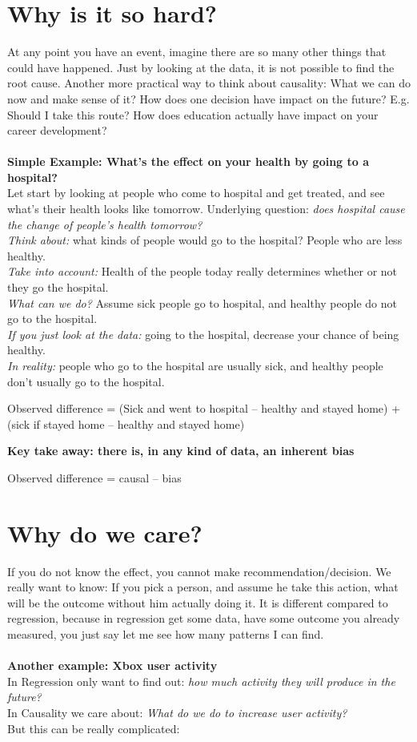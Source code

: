 \section{Why is it so hard?}
At any point you have an event, imagine there are so many other things that could have happened. Just by looking at the data, it is not possible to find the root cause. Another more practical way to think about causality: What we can do now and make sense of it? How does one decision have impact on the future? E.g. Should I take this route? How does education actually have impact on your career development?\\
\\
\textbf{Simple Example: What's the effect on your health by going to a hospital?}\\
Let start by looking at people who come to hospital and get treated, and see what’s their health looks like tomorrow. Underlying question: \textit{does hospital cause the change of people’s health tomorrow?}\\
\textit{Think about:} what kinds of people would go to the hospital? People who are less healthy.\\
\textit{Take into account:} Health of the people today really determines whether or not they go the hospital.\\
\textit{What can we do?} Assume sick people go to hospital, and healthy people do not go to the hospital.\\
\textit{If you just look at the data:} going to the hospital, decrease your chance of being healthy.\\
\textit{In reality:} people who go to the hospital are usually sick, and healthy people don't usually go to the hospital.\\
\begin{center} Observed difference =  (Sick and went to hospital -- healthy and stayed home) + (sick if stayed home -- healthy and stayed home)
\end{center}
\noindent\textbf{Key take away: there is, in any kind of data, an inherent bias}
\begin{center} Observed difference =  causal -- bias
\end{center}

\section{Why do we care?}
If you do not know the effect, you cannot make recommendation/decision. We really want to know: If you pick a person, and assume he take this action, what will be the outcome without him actually doing it.
 It is different compared to regression, because in regression get some data, have some outcome you already measured, you just say let me see how many patterns I can find.\\
\\
\textbf{Another example: Xbox user activity}\\
In Regression only want to find out: \textit{how much activity they will produce in the future?}\\
In Causality we care about: \textit{What do we do to increase user activity?}\\
But this can be really complicated:

